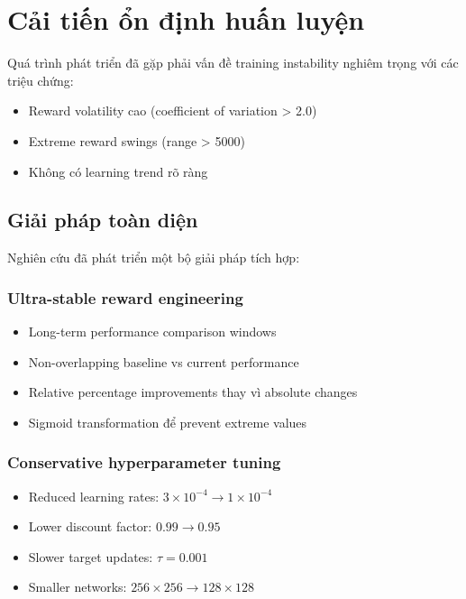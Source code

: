 \section{Cải tiến ổn định huấn luyện}

Quá trình phát triển đã gặp phải vấn đề training instability nghiêm trọng với các
triệu chứng:
\begin{itemize}
    \item Reward volatility cao (coefficient of variation > 2.0)

    \item Extreme reward swings (range > 5000)

    \item Không có learning trend rõ ràng
\end{itemize}

\subsection{Giải pháp toàn diện}
Nghiên cứu đã phát triển một bộ giải pháp tích hợp:

\subsubsection{Ultra-stable reward engineering}
\begin{itemize}
    \item Long-term performance comparison windows

    \item Non-overlapping baseline vs current performance

    \item Relative percentage improvements thay vì absolute changes

    \item Sigmoid transformation để prevent extreme values
\end{itemize}

\subsubsection{Conservative hyperparameter tuning}
\begin{itemize}
    \item Reduced learning rates: $3 \times 10^{-4}\rightarrow 1 \times 10^{-4}$

    \item Lower discount factor: $0.99 \rightarrow 0.95$

    \item Slower target updates: $\tau = 0.001$

    \item Smaller networks: $256 \times 256 \rightarrow 128 \times 128$
\end{itemize}

